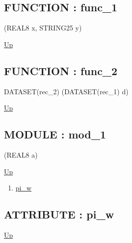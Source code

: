 \subsection*{FUNCTION : func\_1}
\hypertarget{ecldoc:example.func_1}{}
\par
\begin{minipage}[t]{\textwidth}
\begin{flushleft}
  (REAL8 x, STRING25 y)
\end{flushleft}
\end{minipage}
\hyperlink{ecldoc:example}{Up} \\
\par
\par
\subsection*{FUNCTION : func\_2}
\hypertarget{ecldoc:example.func_2}{}
\par
\begin{minipage}[t]{\textwidth}
\begin{flushleft}
DATASET(rec\_2)  (DATASET(rec\_1) d)
\end{flushleft}
\end{minipage}
\hyperlink{ecldoc:example}{Up} \\
\par
\par
\subsection*{MODULE : mod\_1}
\hypertarget{ecldoc:example.mod_1}{}
\par
\begin{minipage}[t]{\textwidth}
\begin{flushleft}
  (REAL8 a)
\end{flushleft}
\end{minipage}
\hyperlink{ecldoc:example}{Up} \\
\par
\par
\begin{enumerate}
\item \hyperlink{ecldoc:example.mod_1.pi_w}{pi\_w}
\end{enumerate}
\subsection*{ATTRIBUTE : pi\_w}
\hypertarget{ecldoc:example.mod_1.pi_w}{}
\par
\begin{minipage}[t]{\textwidth}
\begin{flushleft}
  
\end{flushleft}
\end{minipage}
\hyperlink{ecldoc:example.mod_1}{Up} \\
\par
\par

